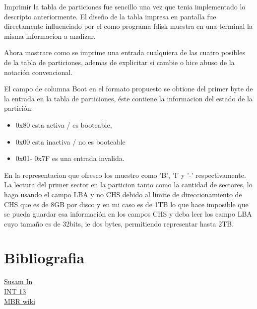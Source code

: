 \documentclass[10pt,oneside,a4paper]{article}
\begin{document}
Imprimir la tabla de particiones fue sencillo una vez que tenia implementado
lo descripto anteriormente.
El diseño de la tabla impresa en pantalla fue directamente influenciado por
el como programa fdisk muestra en una terminal la misma informacion a
analizar.

Ahora mostrare como se imprime una entrada cualquiera
de las cuatro posibles de la tabla de particiones, ademas de explicitar si
cambie o hice abuso de la notación convencional.

El campo de columna Boot en el formato propuesto se obtione del primer
byte de la entrada en la tabla de
particiones, éste contiene la informacion del estado de la partición:

\begin{itemize}
\item 0x80 esta activa / es booteable, 
\item 0x00 esta inactiva / no es booteable
\item 0x01- 0x7F es una entrada invalida.
\end{itemize}

En la representacion que ofresco los muestro como 'B', 'I' y '-'
respectivamente.\\

La lectura del primer sector en la particion tanto como la cantidad de sectores,
lo hago usando el campo LBA y no CHS debido al limite de direccionamiento de 
CHS que es de 8GB por disco y en mi caso es de 1TB lo que hace imposible 
que se pueda guardar
esa información en los campos CHS y deba leer los campo LBA cuyo tamaño es
de 32bits, ie dos bytes, permitiendo representar hasta 2TB.

\section*{Bibliografia}


\href{http://susam.in/articles/boot-sector-code/}{Susam In}\\
\href{http://www.pelletiernet.com/helppc/int_13-2.html}{INT 13}\\
\href{http://en.wikipedia.org/wiki/Master_boot_record}{MBR wiki}
\end{document}

